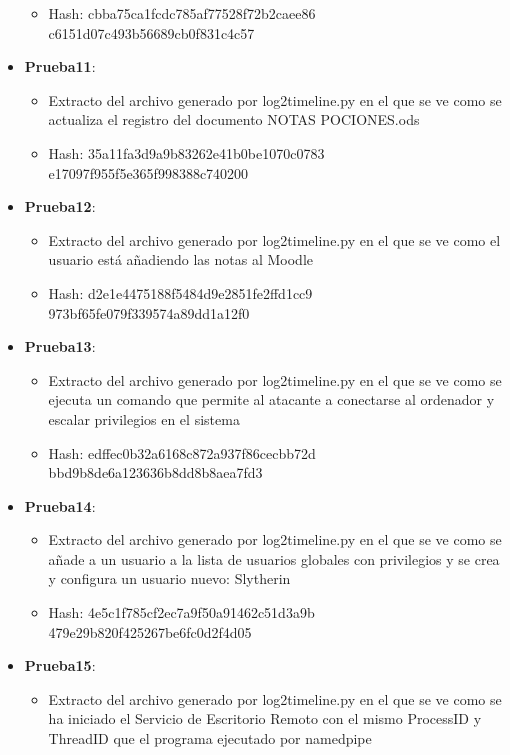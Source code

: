 \begin{itemize}
{\begin{itemize}
      \item{Hash}: cbba75ca1fcdc785af77528f72b2caee86\\c6151d07c493b56689cb0f831c4c57
    \end{itemize}}
  \item{\textbf{Prueba11}: 
    \begin{itemize}
      \item{Extracto del archivo generado por log2timeline.py en el que se ve como se actualiza el registro del documento NOTAS POCIONES.ods}
      \item{Hash}: 35a11fa3d9a9b83262e41b0be1070c0783\\e17097f955f5e365f998388c740200
    \end{itemize}}
  \item{\textbf{Prueba12}: 
    \begin{itemize}
      \item{Extracto del archivo generado por log2timeline.py en el que se ve como el usuario está añadiendo las notas al Moodle}
      \item{Hash}: d2e1e4475188f5484d9e2851fe2ffd1cc9\\973bf65fe079f339574a89dd1a12f0
    \end{itemize}}
  \item{\textbf{Prueba13}: 
    \begin{itemize}
      \item{Extracto del archivo generado por log2timeline.py en el que se ve como se ejecuta un comando que permite al atacante a conectarse al ordenador y escalar privilegios en el sistema}
      \item{Hash}: edffec0b32a6168c872a937f86cecbb72d\\bbd9b8de6a123636b8dd8b8aea7fd3
    \end{itemize}}
  \item{\textbf{Prueba14}: 
    \begin{itemize}
      \item{Extracto del archivo generado por log2timeline.py en el que se ve como se añade a un usuario a la lista de usuarios globales con privilegios y se crea y configura un usuario nuevo: Slytherin}
      \item{Hash}: 4e5c1f785cf2ec7a9f50a91462c51d3a9b\\479e29b820f425267be6fc0d2f4d05
    \end{itemize}}
  \item{\textbf{Prueba15}: 
    \begin{itemize}
      \item{Extracto del archivo generado por log2timeline.py en el que se ve como se ha iniciado el Servicio de Escritorio Remoto con el mismo ProcessID y ThreadID que el programa ejecutado por namedpipe}

\end{itemize}}
\end{itemize}
